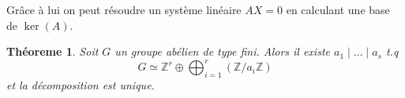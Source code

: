 \documentclass[a4paper,12pt]{book}
\newcommand{\Z}{\mathbb{Z}}
\theoremstyle{plain}
\newtheorem{thm}[subsection]{Théoreme}
\theoremstyle{definition}
\theoremstyle{remark}
\begin{document}
Grâce à lui on peut résoudre un système linéaire $AX=0$ en calculant
une base de $\ker(A)$.

\begin{thm}
    Soit $G$ un groupe abélien de type fini. Alors il existe
    $a_1\mid\ldots\mid a_s$ t.q \[G\simeq \Z^r\oplus \bigoplus_{i=1}^r
    (\Z/a_i\Z)\] et la décomposition est unique.
\end{thm}






\printbibliography
\end{document}
